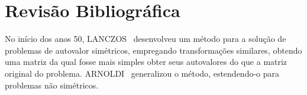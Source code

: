 \chapter{Revisão Bibliográfica}

No início dos anos 50, LANCZOS~\cite{Lan50a} desenvolveu um método para a
solução de problemas de autovalor simétricos, empregando transformações
similares, obtendo uma matriz da qual fosse mais simples obter seus
autovalores do que a matriz original do problema. ARNOLDI~\cite{Arn51a}
generalizou o método, estendendo-o para problemas não simétricos.

